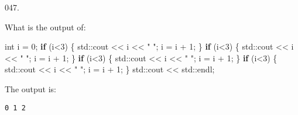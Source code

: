 \documentclass[]{book}
\newenvironment{Shaded}{}{}
\newcommand{\BuiltInTok}[1]{#1}
\newcommand{\ControlFlowTok}[1]{\textcolor[rgb]{0.00,0.44,0.13}{\textbf{#1}}}
\newcommand{\DataTypeTok}[1]{\textcolor[rgb]{0.56,0.13,0.00}{#1}}
\newcommand{\DecValTok}[1]{\textcolor[rgb]{0.25,0.63,0.44}{#1}}
\newcommand{\NormalTok}[1]{#1}
\newcommand{\StringTok}[1]{\textcolor[rgb]{0.25,0.44,0.63}{#1}}
\begin{document}
\begin{minipage}{\linewidth}\noindent
{\tiny 047.}\\
\begin{minipage}[t]{.485\linewidth}

What is the output of:

\begin{framed}

\begin{Shaded}
\begin{Highlighting}[]
\DataTypeTok{int}\NormalTok{ i = }\DecValTok{0}\NormalTok{;}
\ControlFlowTok{if}\NormalTok{ (i<}\DecValTok{3}\NormalTok{) \{}
  \BuiltInTok{std::}\NormalTok{cout << i << }\StringTok{" "}\NormalTok{;}
\NormalTok{  i = i + }\DecValTok{1}\NormalTok{;}
\NormalTok{\}}
\ControlFlowTok{if}\NormalTok{ (i<}\DecValTok{3}\NormalTok{) \{}
  \BuiltInTok{std::}\NormalTok{cout << i << }\StringTok{" "}\NormalTok{;}
\NormalTok{  i = i + }\DecValTok{1}\NormalTok{;}
\NormalTok{\}}
\ControlFlowTok{if}\NormalTok{ (i<}\DecValTok{3}\NormalTok{) \{}
  \BuiltInTok{std::}\NormalTok{cout << i << }\StringTok{" "}\NormalTok{;}
\NormalTok{  i = i + }\DecValTok{1}\NormalTok{;}
\NormalTok{\}}
\ControlFlowTok{if}\NormalTok{ (i<}\DecValTok{3}\NormalTok{) \{}
  \BuiltInTok{std::}\NormalTok{cout << i << }\StringTok{" "}\NormalTok{;}
\NormalTok{  i = i + }\DecValTok{1}\NormalTok{;}
\NormalTok{\}}
\BuiltInTok{std::}\NormalTok{cout << }\BuiltInTok{std::}\NormalTok{endl;}
\end{Highlighting}
\end{Shaded}

\end{framed}

\end{minipage}
\hfill
\begin{minipage}[t]{.485\linewidth}

The output is:

\begin{framed}

\begin{verbatim}
0 1 2 
\end{verbatim}

\end{framed}

\end{minipage}
\end{minipage}

\vspace{2mm}\noindent\hrulefill{}
\end{document}
